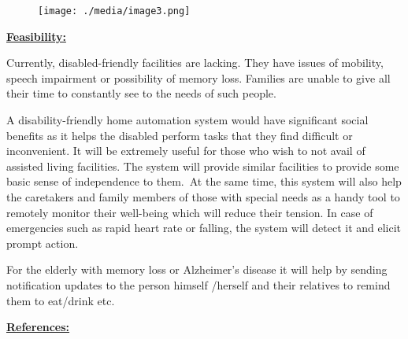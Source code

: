 \documentclass[12pt]{article}
\begin{document}

\begin{figure}[H]
	\begin{Center}
		\texttt{[image: ./media/image3.png]}
	\end{Center}
\end{figure}



\par


\vspace{\baselineskip}
{\fontsize{14pt}{16.8pt}\selectfont \textbf{\uline{Feasibility:}}\par}\par

\begin{justify}
Currently, disabled-friendly facilities are lacking. They have issues of mobility, speech impairment or possibility of memory loss. Families are unable to give all their time to constantly see to the needs of such people. 
\end{justify}\par

\begin{justify}
A disability-friendly home automation system would have significant social benefits as it helps the disabled perform tasks that they find difficult or inconvenient. It will be extremely useful for those who wish to not avail of assisted living facilities. The system will provide similar facilities to provide some basic sense of independence to them. At the same time, this system will also help the caretakers and family members of those with special needs as a handy tool to remotely monitor their well-being which will reduce their tension. In case of emergencies such as rapid heart rate or falling, the system will detect it and elicit prompt action.
\end{justify}\par

\begin{justify}
For the elderly with memory loss or Alzheimer’s disease it will help by sending notification updates to the person himself /herself and their relatives to remind them to eat/drink etc. 
\end{justify}\par


\vspace{\baselineskip}
{\fontsize{14pt}{16.8pt}\selectfont \textbf{\uline{References:}}\par}\par
\end{document}
